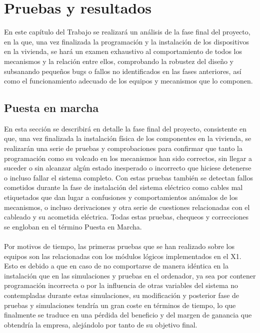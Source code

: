 \chapter{Pruebas y resultados}

En este capítulo del Trabajo se realizará un análisis de la fase final del proyecto, en la que, una vez finalizada la programación y la instalación de los dispositivos en la vivienda, se hará un examen exhaustivo al comportamiento de todos los mecanismos y la relación entre ellos,  comprobando la robustez del diseño y subsanando pequeños bugs o fallos no identificados en las fases anteriores, así como el funcionamiento adecuado de los equipos y mecanismos que lo componen.

\section{Puesta en marcha}
En esta sección se describirá en detalle la fase final del proyecto, consistente en que, una vez finalizada la instalación física de los componentes en la vivienda, se realizarán una serie de pruebas y comprobaciones para confirmar que tanto la programación como su volcado en los mecanismos han sido correctos, sin llegar a suceder o sin alcanzar algún estado inesperado o incorrecto que hiciese detenerse o incluso fallar el sistema completo. Con estas pruebas también se detectan fallos cometidos durante la fase de instalación del sistema eléctrico como cables mal etiquetados que dan lugar a confusiones y comportamientos anómalos de los mecanismos, o incluso derivaciones y otra serie de cuestiones relacionadas con el cableado y su acometida eléctrica. Todas estas pruebas, chequeos y correcciones se engloban en el término Puesta en Marcha.\\\\

Por motivos de tiempo, las primeras pruebas que se han realizado sobre los equipos son las relacionadas con los módulos lógicos implementados en el X1. Esto es debido a que en caso de no comportarse de manera idéntica en la instalación que en las simulaciones y pruebas en el ordenador, ya sea por contener programación incorrecta o por la influencia de otras variables del sistema no contempladas durante estas simulaciones, su modificación y posterior fase de pruebas y simulaciones tendría un gran coste en términos de tiempo, lo que finalmente se traduce en una pérdida del beneficio y del margen de ganancia que obtendría la empresa, alejándolo por tanto de su objetivo final.\\\\

